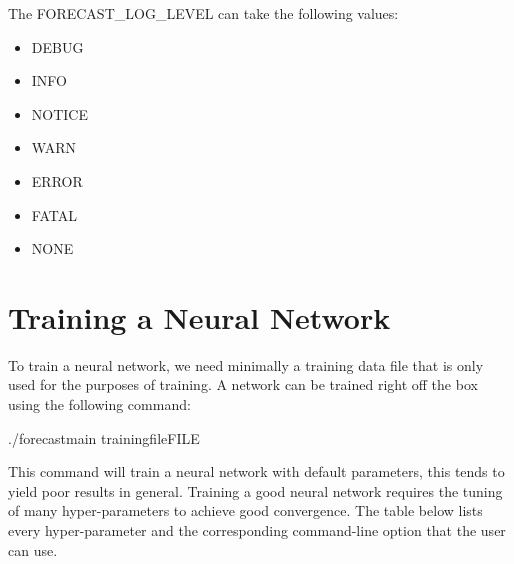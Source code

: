 \documentclass[letterpaper,10pt,english]{sphinxmanual}
\begin{document}
The FORECAST\_LOG\_LEVEL can take the following values:
\begin{itemize}
\item {} 
DEBUG

\item {} 
INFO

\item {} 
NOTICE

\item {} 
WARN

\item {} 
ERROR

\item {} 
FATAL

\item {} 
NONE

\end{itemize}


\section{Training a Neural Network}
\label{\detokenize{usage:training-a-neural-network}}
To train a neural network, we need minimally a training data file that is only used
for the purposes of training. A network can be trained right off the box using the
following command:

\begin{sphinxVerbatim}[commandchars=\\\{\}]
./forecast\PYGZus{}main \PYGZhy{}\PYGZhy{}training\PYGZhy{}file\PYGZlt{}FILE\PYGZgt{}
\end{sphinxVerbatim}

This command will train a neural network with default parameters, this tends to yield
poor results in general. Training a good neural network requires the tuning of many
hyper-parameters to achieve good convergence. The table below lists every hyper-parameter
and the corresponding command-line option that the user can use.
\end{document}
